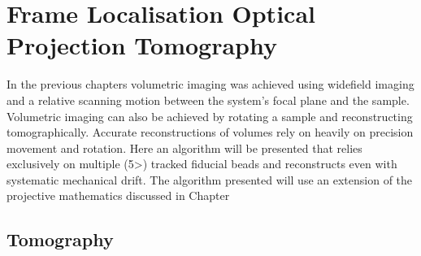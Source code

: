 \ifpdf
    \graphicspath{{Chapters/flopt/Figs/Raster/}{Chapters/flopt/Figs/PDF/}{Chapters/flopt/Figs/}}
\else
    \graphicspath{{Chapters/flopt/Figs/Vector/}{Chapters/flopt/Figs/}}
\fi

\chapter{Frame Localisation Optical Projection Tomography}

In the previous chapters volumetric imaging was achieved using widefield imaging and a relative scanning motion between the system's focal plane and the sample.
Volumetric imaging can also be achieved by rotating a sample and reconstructing tomographically.
Accurate reconstructions of volumes rely on heavily on precision movement and rotation.
Here an algorithm will be presented that relies exclusively on multiple (5>) tracked fiducial beads and reconstructs even with systematic mechanical drift.
The algorithm presented will use an extension of the projective mathematics discussed in Chapter %


\section{Tomography}


